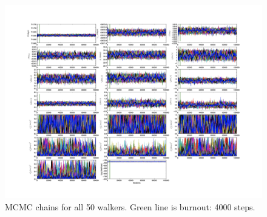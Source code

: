 \documentclass{article}
\begin{document}
\begin{figure}[!htb]
\centering
\includegraphics[width=\textwidth]{chainPlot_100000_gammas.jpg}
\caption{MCMC chains for all 50 walkers. Green line is burnout: 4000 steps.}
\end{figure}
\end{document}
